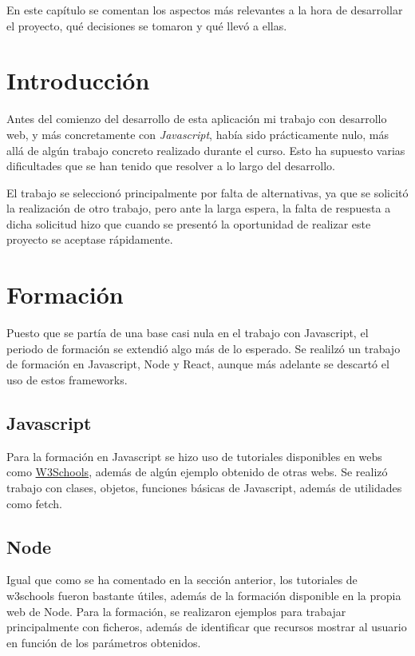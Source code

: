 
En este capítulo se comentan los aspectos más relevantes a la hora de desarrollar el proyecto, qué decisiones se tomaron y qué llevó a ellas.

\section{Introducción}

Antes del comienzo del desarrollo de esta aplicación mi trabajo con desarrollo web, y más concretamente con \emph{Javascript}, había sido prácticamente nulo, más allá de algún trabajo concreto realizado durante el curso. Esto ha supuesto varias dificultades que se han tenido que resolver a lo largo del desarrollo.

El trabajo se seleccionó principalmente por falta de alternativas, ya que se solicitó la realización de otro trabajo, pero ante la larga espera, la falta de respuesta a dicha solicitud hizo que cuando se presentó la oportunidad de realizar este proyecto se aceptase rápidamente.

\section{Formación}

Puesto que se partía de una base casi nula en el trabajo con Javascript, el periodo de formación se extendió algo más de lo esperado. Se realilzó un trabajo de formación en Javascript, Node y React, aunque más adelante se descartó el uso de estos frameworks.

\subsection{Javascript}

Para la formación en Javascript se hizo uso de tutoriales disponibles en webs como \href{https://www.w3schools.com/js/}{W3Schools}, además de algún ejemplo obtenido de otras webs. Se realizó trabajo con clases, objetos, funciones básicas de Javascript, además de utilidades como fetch.

\subsection{Node}

Igual que como se ha comentado en la sección anterior, los tutoriales de w3schools fueron bastante útiles, además de la formación disponible en la propia web de Node. Para la formación, se realizaron ejemplos para trabajar principalmente con ficheros, además de identificar que recursos mostrar al usuario en función de los parámetros obtenidos.

